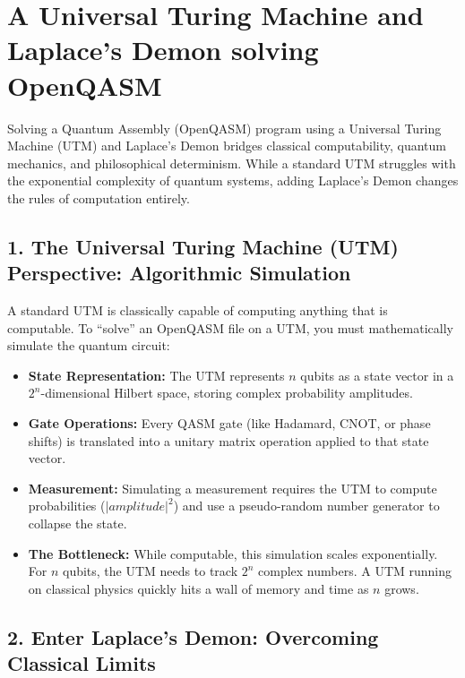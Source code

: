 \chapter{\texorpdfstring{A Universal Turing Machine and Laplace's Demon solving OpenQASM}{A Universal Turing Machine and Laplace's Demon solving OpenQASM}}
\label{chap:utm-demon-openqasm}

Solving a Quantum Assembly (OpenQASM) program using a Universal Turing Machine (UTM) and Laplace's Demon bridges classical computability, quantum mechanics, and philosophical determinism. While a standard UTM struggles with the exponential complexity of quantum systems, adding Laplace's Demon changes the rules of computation entirely.

\section{\texorpdfstring{1. The Universal Turing Machine (UTM) Perspective: Algorithmic Simulation}{1. The Universal Turing Machine (UTM) Perspective: Algorithmic Simulation}}

A standard UTM is classically capable of computing anything that is computable. To “solve” an OpenQASM file on a UTM, you must mathematically simulate the quantum circuit:

\begin{itemize}
\item \textbf{State Representation:} The UTM represents \(n\) qubits as a state vector in a \(2^n\)-dimensional Hilbert space, storing complex probability amplitudes.
\item \textbf{Gate Operations:} Every QASM gate (like Hadamard, CNOT, or phase shifts) is translated into a unitary matrix operation applied to that state vector.
\item \textbf{Measurement:} Simulating a measurement requires the UTM to compute probabilities (\(|amplitude|^2\)) and use a pseudo-random number generator to collapse the state.
\item \textbf{The Bottleneck:} While computable, this simulation scales exponentially. For \(n\) qubits, the UTM needs to track \(2^n\) complex numbers. A UTM running on classical physics quickly hits a wall of memory and time as \(n\) grows.
\end{itemize}

\section{\texorpdfstring{2. Enter Laplace's Demon: Overcoming Classical Limits}{2. Enter Laplace's Demon: Overcoming Classical Limits}}

